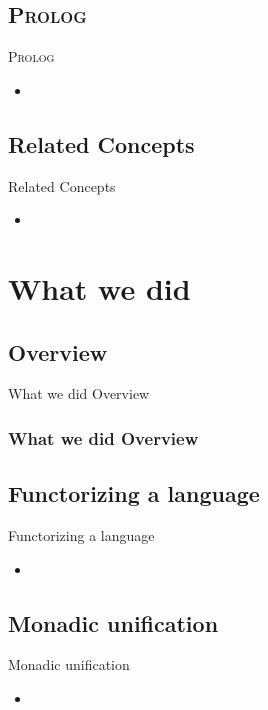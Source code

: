 \documentclass[hideothersubsections]{beamer}
\newcommand{\progLang}[1]{\textsc{#1}}
\begin{document}
\subsection{\progLang{Prolog}}
\begin{frame}{\progLang{Prolog}}
\begin{itemize}
\item
\end{itemize}

\end{frame}

\subsection{Related Concepts}
\begin{frame}{Related Concepts}
\begin{itemize}
\item
\end{itemize}

\end{frame}


\section{What we did}

\subsection{Overview}
\begin{frame}{What we did Overview}
	
	\frametitle{What we did Overview}
	
\end{frame}

\subsection{Functorizing a language}
\begin{frame}{Functorizing a language}
\begin{itemize}
\item
\end{itemize}

\end{frame}


\subsection{Monadic unification}
\begin{frame}{Monadic unification}
\begin{itemize}
\item
\end{itemize}

\end{frame}
\end{document}
